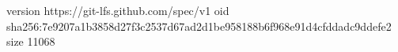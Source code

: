 version https://git-lfs.github.com/spec/v1
oid sha256:7e9207a1b3858d27f3c2537d67ad2d1be958188b6f968e91d4cfddadc9ddefe2
size 11068
